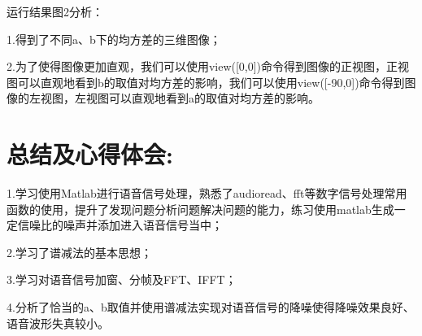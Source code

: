 \documentclass[a4paper,11pt,UTF8]{ctexart}
\begin{document}
运行结果图2分析：\par
1.得到了不同a、b下的均方差的三维图像；\par
2.为了使得图像更加直观，我们可以使用view([0,0])命令得到图像的正视图，正视图可以直观地看到b的取值对均方差的影响，我们可以使用view([-90,0])命令得到图像的左视图，左视图可以直观地看到a的取值对均方差的影响。



\section{总结及心得体会:}

1.学习使用Matlab进行语音信号处理，熟悉了audioread、fft等数字信号处理常用函数的使用，提升了发现问题分析问题解决问题的能力，练习使用matlab生成一定信噪比的噪声并添加进入语音信号当中；\par 
2.学习了谱减法的基本思想；\par 
3.学习对语音信号加窗、分帧及FFT、IFFT；\par 
4.分析了恰当的a、b取值并使用谱减法实现对语音信号的降噪使得降噪效果良好、语音波形失真较小。
\end{document}
